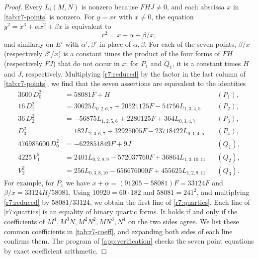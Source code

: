 \documentclass[12pt,oneside,openany]{book}
\theoremstyle{definition}
\theoremstyle{plain}
\numberwithin{equation}{chapter}
\theoremstyle{plain}
\theoremstyle{definition}
\theoremstyle{remark}
\begin{document}
\begin{proof}
Every $L_i(M,N)$ is nonzero because $FHJ\ne0$, and each abscissa $x$ in
\cref{tab:r7-points} is nonzero. For $y=xr$ with $x\ne0$, the equation
$y^2=x^3+\alpha x^2+\beta x$ is equivalent to
\begin{equation}\label{r7:reduced}
 r^2=x+\alpha+\beta/x,
\end{equation}
and similarly on $E'$ with $\alpha',\beta'$ in place of $\alpha,\beta$. For
each of the seven points, $\beta/x$ (respectively $\beta'/x$) is a constant
times the product of the four forms of $FH$ (respectively $FJ$) that do not
occur in $x$; for $P_1$ and $Q_1$, it is a constant times $H$ and $J$,
respectively.
Multiplying \eqref{r7:reduced} by the factor in the last column of
\cref{tab:r7-points}, we find that the seven assertions are equivalent to
the identities
\begin{equation}\label{r7:quartics}
\begin{aligned}
 3600\,D_0^2&=58081F+H &&(P_1),\\
 16\,D_1^2&=30625L_{0,2,6,7}+20521125F-54756L_{1,3,4,5} &&(P_2),\\
 36\,D_2^2&=-56875L_{1,2,5,6}+2280125F+364L_{0,3,4,7} &&(P_3),\\
 D_3^2&=182L_{2,3,6,7}+32925005F-23718422L_{0,1,4,5} &&(P_4),\\
 476985600\,D_0^2&=-622851849F+9J &&(Q_1),\\
 4225\,V_1^2&=2401L_{0,2,8,9}-572037760F+36864L_{1,3,10,11} &&(Q_2),\\
 V_2^2&=256L_{0,3,8,10}-656676000F+455625L_{1,2,9,11} &&(Q_3).
\end{aligned}
\end{equation}
For example, for $P_1$ we have $x+\alpha=(91205-58081)F=33124F$ and
$\beta/x=33124H/58081$. Using $10920=60\cdot182$ and $58081=241^2$, and
multiplying \eqref{r7:reduced} by $58081/33124$, we obtain the first line
of \eqref{r7:quartics}. Each line of \eqref{r7:quartics} is an equality of
binary quartic forms. It holds if and only if the coefficients of
$M^4,M^3N,M^2N^2,MN^3,N^4$ on the two sides agree. We list these common
coefficients in \cref{tab:r7-coeff}, and expanding both sides of each line
confirms them. The program of \cref{app:verification} checks the
seven point equations by exact coefficient arithmetic.
\end{proof}
\end{document}
